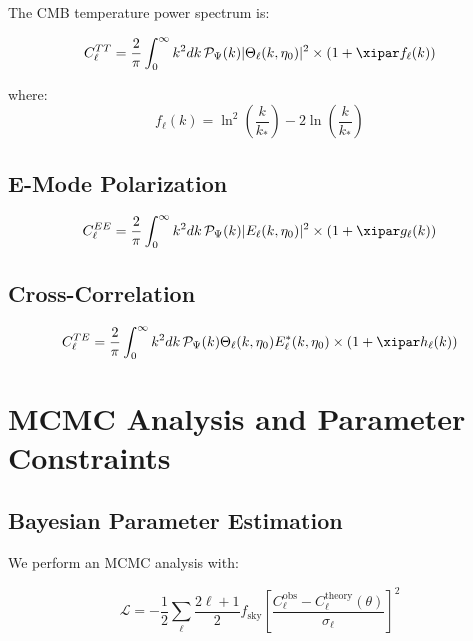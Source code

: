 	The CMB temperature power spectrum is:
	
	\begin{equation}
		C_\ell^{TT} = \frac{2}{\pi}\int_0^\infty k^2 dk \, \mathcal{P}_\Psi(k) |\Theta_\ell(k,\eta_0)|^2 \times \left(1 + \xipar f_\ell(k)\right)
		\label{eq:cl_tt}
	\end{equation}
	
	where:
	\begin{equation}
		f_\ell(k) = \ln^2\left(\frac{k}{k_*}\right) - 2\ln\left(\frac{k}{k_*}\right)
	\end{equation}
	
	\subsection{E-Mode Polarization}
	
	\begin{equation}
		C_\ell^{EE} = \frac{2}{\pi}\int_0^\infty k^2 dk \, \mathcal{P}_\Psi(k) |E_\ell(k,\eta_0)|^2 \times \left(1 + \xipar g_\ell(k)\right)
	\end{equation}
	
	\subsection{Cross-Correlation}
	
	\begin{equation}
		C_\ell^{TE} = \frac{2}{\pi}\int_0^\infty k^2 dk \, \mathcal{P}_\Psi(k) \Theta_\ell(k,\eta_0) E_\ell^*(k,\eta_0) \times \left(1 + \xipar h_\ell(k)\right)
	\end{equation}
	
	\section{MCMC Analysis and Parameter Constraints}
	\label{sec:mcmc}
	
	\subsection{Bayesian Parameter Estimation}
	
	We perform an MCMC analysis with:
	
	\begin{equation}
		\mathcal{L} = -\frac{1}{2}\sum_{\ell} \frac{2\ell+1}{2} f_{\text{sky}} \left[\frac{C_\ell^{\text{obs}} - C_\ell^{\text{theory}}(\theta)}{\sigma_\ell}\right]^2
	\end{equation}
	
